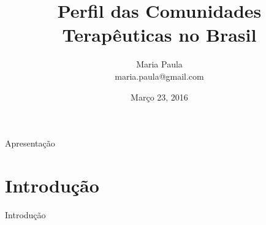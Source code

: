 

\title{Perfil das Comunidades Terapêuticas no Brasil}
\subtitle{}
\date{Março 23, 2016}
\author{Maria Paula \\ maria.paula@gmail.com}


\usepackage{Sweave}





\begin{frame}
\maketitle
\end{frame}



\begin{frame}{Apresentação}
\tableofcontents
\end{frame}



\section{Introdução}
\begin{frame}{Introdução}

\end{frame}


